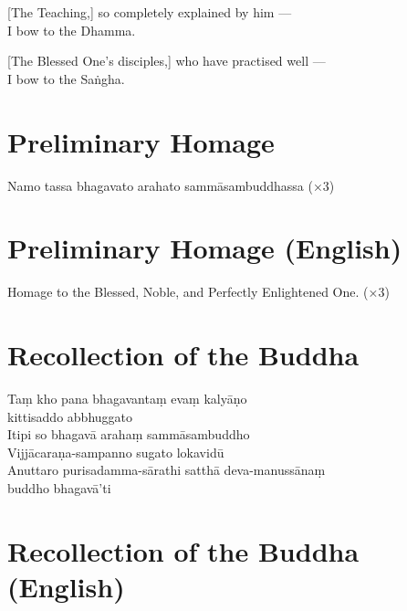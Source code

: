 [The Teaching,] so completely explained by him ---\\
I bow to the Dhamma.

[The Blessed One's disciples,] who have practised well ---\\
I bow to the Saṅgha.

\section*{Preliminary Homage}

\begin{leader}
\end{leader}

Namo tassa bhagavato arahato sammāsambuddhassa (×3)

\section*{Preliminary Homage (English)}

\begin{leader}
\end{leader}

Homage to the Blessed, Noble, and Perfectly Enlightened One. (×3)

\clearpage

\section*{Recollection of the Buddha}

\begin{leader}
\end{leader}

Taṃ kho pana bhagavantaṃ evaṃ kalyāṇo\\
\vin kittisaddo abbhuggato\\
Itipi so bhagavā arahaṃ sammāsambuddho\\
Vijjācaraṇa-sampanno sugato lokavidū\\
Anuttaro purisadamma-sārathi satthā deva-manussānaṃ\\
\vin buddho bhagavā'ti

\section*{Recollection of the Buddha (English)}


